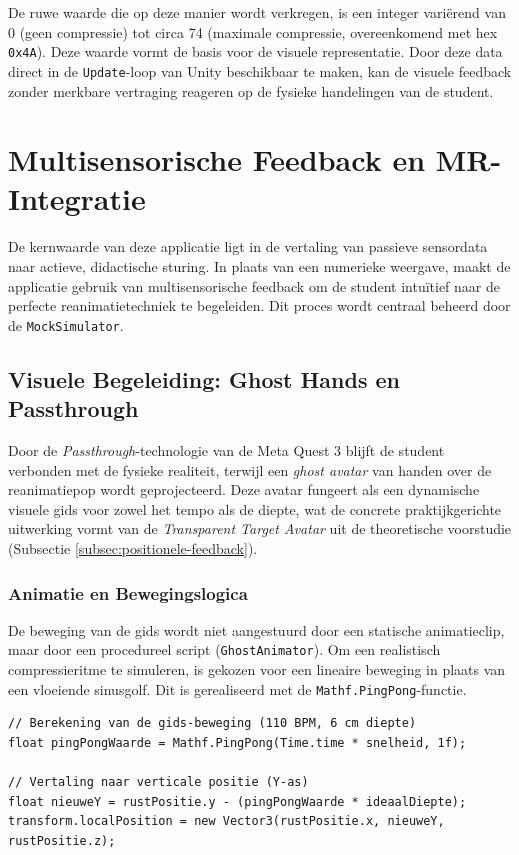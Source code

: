De ruwe waarde die op deze manier wordt verkregen, is een integer variërend van 0 (geen compressie) tot circa 74 (maximale compressie, overeenkomend met hex 
\texttt{0x4A}). Deze waarde vormt de basis voor de visuele representatie. Door deze data direct in de \texttt{Update}-loop van Unity beschikbaar te maken,
kan de visuele feedback zonder merkbare vertraging reageren op de fysieke handelingen van de student.




\section{Multisensorische Feedback en MR-Integratie}
De kernwaarde van deze applicatie ligt in de vertaling van passieve sensordata naar actieve, didactische sturing. 
In plaats van een numerieke weergave, maakt de applicatie gebruik van multisensorische feedback om de student intuïtief naar de 
perfecte reanimatietechniek te begeleiden. Dit proces wordt centraal beheerd door de \texttt{MockSimulator}.

\subsection{Visuele Begeleiding: Ghost Hands en Passthrough}
Door de \textit{Passthrough}-technologie van de Meta Quest 3 blijft de student verbonden met de fysieke realiteit, terwijl een \textit{ghost avatar} 
van handen over de reanimatiepop wordt geprojecteerd. Deze avatar fungeert als een dynamische visuele gids voor zowel het tempo als de diepte, 
wat de concrete praktijkgerichte uitwerking vormt van de \textit{Transparent Target Avatar} uit de theoretische voorstudie (Subsectie \ref{subsec:positionele-feedback}).

\subsubsection{Animatie en Bewegingslogica}
De beweging van de gids wordt niet aangestuurd door een statische animatieclip, maar door een procedureel script (\texttt{GhostAnimator}). 
Om een realistisch compressieritme te simuleren, is gekozen voor een lineaire beweging in plaats van een vloeiende sinusgolf. Dit is gerealiseerd met de \texttt{Mathf.PingPong}-functie.

\begin{listing}[htbp]
\begin{verbatim}
// Berekening van de gids-beweging (110 BPM, 6 cm diepte)
float pingPongWaarde = Mathf.PingPong(Time.time * snelheid, 1f);

// Vertaling naar verticale positie (Y-as)
float nieuweY = rustPositie.y - (pingPongWaarde * ideaalDiepte);
transform.localPosition = new Vector3(rustPositie.x, nieuweY, rustPositie.z);
\end{verbatim}
\caption{Procedurele berekening van de gidsbeweging via de \texttt{Mathf.PingPong}-functie.}
\label{lst:ghost_hands_movement}
\end{listing}

